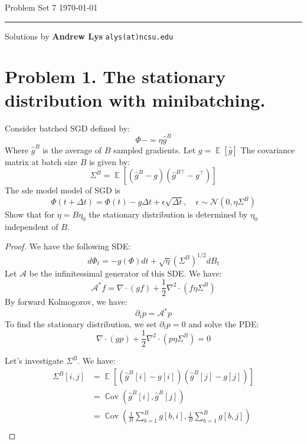 \documentclass{amsart}
\newcommand{\cA}{\mathcal{A}}
\newcommand{\cN}{\mathcal{N}}
\newcommand{\Cov}[1]{\operatorname{\mathbb{C}ov}\left(#1\right)}
\newcommand{\ee}[1]{\operatorname{\mathbb{E}}\left[#1\right]}
\theoremstyle{definition}
\begin{document}
\noindent
Problem Set 7  \hfill \today  %
\smallskip
\hrule
\smallskip
\noindent
Solutions by {\bf Andrew Lys} \qquad   %
  {\tt alys(at)ncsu.edu}

\vspace{0.5cm}

\section*{Problem 1. The stationary distribution with minibatching.}
Consider batched SGD defined by:
\[
\Phi -= \eta \hat{g}^B
\]
Where $\hat{g}^B$ is the average of $B$ sampled gradients. 
Let $g = \ee{\hat{g}}$
The covariance matrix at batch size $B$ is given by:
\[
\Sigma^B = \ee{(\hat{g}^B - g)(\hat{g}^{B\top} - g^\top)}
\]
The sde model model of SGD is 
\[
\Phi(t + \Delta t) = \Phi(t) - g\Delta t + \epsilon \sqrt{\Delta t}, \quad \epsilon \sim \cN(0, \eta \Sigma^B)
\]
Show that for $\eta = B \eta_0$ the stationary distribution is determined by $\eta_0$ independent of $B$. 
\begin{proof}
We have the following SDE:
\[
d \Phi_t = - g(\Phi) d t + \sqrt{\eta} (\Sigma^B)^{1/2} d B_t
\]
Let $\cA$ be the infinitessimal generator of this SDE. 
We have:
\[
\cA^\ast f =  \nabla \cdot (g f) + \frac12 \nabla^2 \cdot (f \eta\Sigma^B)
\]
By forward Kolmogorov, we have:
\[
\partial_t p = \cA^\ast p 
\]
To find the stationary distribution, we set $\partial_t p = 0$ and solve the PDE:
\[
\nabla \cdot (g p) + \frac12 \nabla^2 \cdot (p \eta\Sigma^B) = 0
\]

Let's investigate $\Sigma^B$. We have:
\begin{align*}
  \Sigma^B[i,j] &= \ee{(\hat{g}^B[i] - g[i])(\hat{g}^B[j] - g[j])} \\
  &= \Cov{\hat{g}^B[i], \hat{g}^B[j]} \\
  &= \Cov{\frac{1}{B} \sum_{b = 1}^B g[b, i], \frac{1}{B} \sum_{b = 1}^B g[b, j]} \\
\end{align*}

\end{proof}
\end{document}

